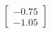 \documentclass[preview]{standalone}
\begin{document}
\begin{align*}
\begin{bmatrix} -0.75 \\ -1.05 \end{bmatrix}
\end{align*}
\end{document}
